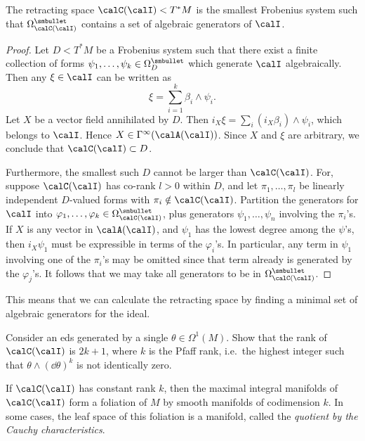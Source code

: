 \begin{prop}
    The retracting space $\calC(\calI)<T^\ast M$ is the smallest Frobenius system such that $\Omega^{\smbullet}_{\calC(\calI)}$ contains a set of algebraic generators of $\calI$.
\end{prop}
\begin{proof}
    Let $D<T^\ast M$ be a Frobenius system such that there exist a finite collection of forms $\psi_1,\ldots,\psi_k\in \Omega^{\smbullet}_D$ which generate $\calI$ algebraically. Then any $\xi\in \calI$ can be written as
    \[\xi=\sum_{i=1}^k \beta_i\wedge \psi_i.\]
    Let $X$ be a vector field annihilated by $D$. Then $i_X \xi=\sum_i (i_X \beta_i)\wedge\psi_i$, which belongs to $\calI$. Hence $X\in\Gamma^\infty(\calA(\calI))$. Since $X$ and $\xi$ are arbitrary, we conclude that $\calC(\calI)\subset D$.

    Furthermore, the smallest such $D$ cannot be larger than $\calC(\calI)$. For, suppose $\calC(\calI)$ has co-rank $l>0$ within $D$, and let $\pi_1,\ldots,\pi_l$ be linearly independent $D$-valued forms with $\pi_i\notin \calC(\calI)$. Partition the generators for $\calI$ into $\varphi_1,\ldots,\varphi_k\in \Omega^{\smbullet}_{\calC(\calI)}$, plus generators $\psi_1,\ldots,\psi_n$ involving the $\pi_i$'s. If $X$ is any vector in $\calA(\calI)$, and $\psi_1$ has the lowest degree among the $\psi$'s, then $i_X\psi_1$ must be expressible in terms of the $\varphi_i$'s. In particular, any term in $\psi_1$ involving one of the $\pi_i$'s may be omitted since that term already is generated by the $\varphi_j$'s. It follows that we may take all generators to be in $\Omega^{\smbullet}_{\calC(\calI)}$.
\end{proof}

This means that we can calculate the retracting space by finding a minimal set of algebraic generators for the ideal.

\begin{xca}
    Consider an \gls{eds} generated by a single $\theta\in\Omega^1(M)$. Show that the rank of $\calC(\calI)$ is $2k+1$, where $k$ is the Pfaff rank, i.e.\ the highest integer such that $\theta\wedge (\dd\theta)^k$ is not identically zero.
\end{xca}

If $\calC(\calI)$ has constant rank $k$,  then the maximal integral manifolds of $\calC(\calI)$ form a foliation of $M$ by smooth manifolds of codimension $k$. In some cases, the leaf space of this foliation is a manifold, called the \emph{quotient by the Cauchy characteristics}.

